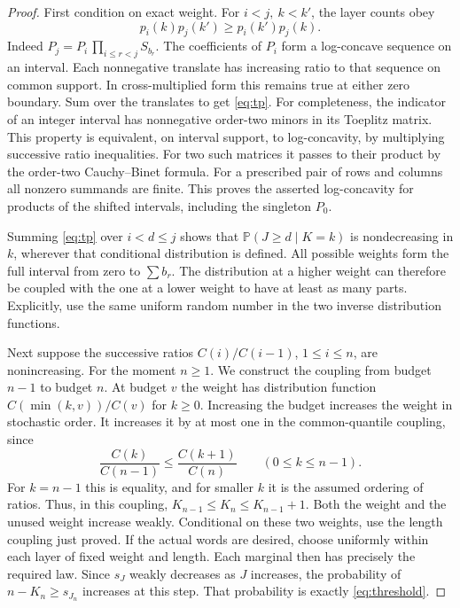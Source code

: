 \documentclass[11pt]{article}
\newcommand{\Prb}{\mathbb P}
\begin{document}
\begin{proof}
First condition on exact weight. For \(i<j,\ k<k'\), the layer counts obey
\begin{equation}
              p_i(k)p_j(k')\ge p_i(k')p_j(k).                       \label{eq:tp}
\end{equation}
Indeed \(P_j=P_i\,\prod_{i\le r<j}S_{b_r}\).
The coefficients of \(P_i\) form a log-concave sequence on an interval.
Each nonnegative translate has increasing ratio to that sequence on
common support. In cross-multiplied form this remains true at either
zero boundary. Sum over the translates to get \eqref{eq:tp}.
For completeness, the indicator of an integer interval has nonnegative order-two minors
in its Toeplitz matrix. This property is equivalent, on interval support,
to log-concavity, by multiplying successive ratio inequalities. For two
such matrices it passes to their product by the order-two Cauchy--Binet
formula. For a prescribed pair of rows and columns all nonzero summands
are finite. This proves the asserted log-concavity for products of the
shifted intervals, including the singleton \(P_0\).

Summing \eqref{eq:tp} over \(i<d\le j\) shows that
\(\Prb(J\ge d\mid K=k)\) is nondecreasing in \(k\), wherever that
conditional distribution is defined. All possible weights form the
full interval from zero to \(\sum b_r\). The distribution at a higher
weight can therefore be coupled with the one at a lower weight to have
at least as many parts. Explicitly, use the same uniform random number
in the two inverse distribution functions.

Next suppose the successive ratios \(C(i)/C(i-1)\), \(1\le i\le n\),
are nonincreasing. For the moment \(n\ge1\). We construct the coupling
from budget \(n-1\) to budget \(n\). At budget \(v\) the weight has
distribution function \(C(\min(k,v))/C(v)\) for \(k\ge0\).
Increasing the budget increases the weight in stochastic order. It
increases it by at most one in the common-quantile coupling, since
\[
        \frac{C(k)}{C(n-1)}\le\frac{C(k+1)}{C(n)}
                \qquad (0\le k\le n-1).
\]
For \(k=n-1\) this is equality, and for smaller \(k\) it is the
assumed ordering of ratios. Thus, in this coupling,
\(K_{n-1}\le K_n\le K_{n-1}+1\). Both the weight and the unused
weight increase weakly. Conditional on these two weights, use the
length coupling just proved. If the actual words are desired, choose
uniformly within each layer of fixed weight and length. Each marginal
then has precisely the required law. Since \(s_J\) weakly decreases as
\(J\) increases, the probability of \(n-K_n\ge s_{J_n}\) increases at
this step. That probability is exactly \eqref{eq:threshold}.


\end{proof}
\end{document}
